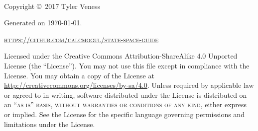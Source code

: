 \begingroup
\thispagestyle{empty}
\vfill
\endgroup

\newpage
~\vfill
\thispagestyle{empty}

Copyright \copyright\ 2017 Tyler Veness

Generated on \monthdayyeardate\today.

\textsc{\url{https://github.com/calcmogul/state-space-guide}}

Licensed under the Creative Commons Attribution-ShareAlike 4.0 Unported License
(the ``License''). You may not use this file except in compliance with the
License. You may obtain a copy of the License at
\url{http://creativecommons.org/licenses/by-sa/4.0}. Unless required by
applicable law or agreed to in writing, software distributed under the License
is distributed on an \textsc{``as is'' basis, without warranties or conditions
of any kind}, either express or implied. See the License for the specific
language governing permissions and limitations under the License.

\pagestyle{empty} %
\tableofcontents %
\cleardoublepage
\pagestyle{fancy} %
